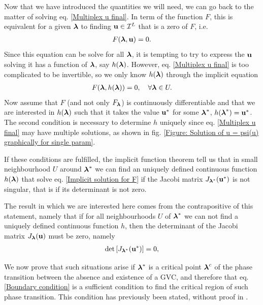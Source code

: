 \documentclass[
11pt, %
english, %
singlespacing, %
nolistspacing, %
liststotoc, %
headsepline, %
]{MastersDoctoralThesis} %
\begin{document}
Now that we have introduced the quantities we will need, we can go back to the matter of solving eq. \eqref{Multiplex u final}. In term of the function $F$, this is equivalent for a given $\boldsymbol{\mathrm{\lambda}}$ to finding $\boldsymbol{\mathrm{u}} \in \mathcal{I}^L$ that is a zero of $F$, i.e.
\begin{align}
	F(\boldsymbol{\mathrm{\lambda}}, \boldsymbol{\mathrm{u}}) = 0. \label{Implicit equation}
\end{align}
Since this equation can be solve for all $\boldsymbol{\mathrm{\lambda}}$, it is tempting to try to express the $\boldsymbol{\mathrm{u}}$ solving it has a function of $\boldsymbol{\mathrm{\lambda}}$, say $h(\boldsymbol{\mathrm{\lambda}})$. However, eq. \eqref{Multiplex u final} is too complicated to be invertible, so we only know $h(\boldsymbol{\mathrm{\lambda}})$ through the implicit equation
\begin{align}
	F(\boldsymbol{\mathrm{\lambda}}, h(\boldsymbol{\mathrm{\lambda}})) = 0, \quad \forall \boldsymbol{\mathrm{\lambda}} \in U. \label{Implicit solution for F}
\end{align}
Now assume that $F$ (and not only $F_{\boldsymbol{\mathrm{\lambda}}}$) is continuously differentiable and that we are interested in $h(\boldsymbol{\mathrm{\lambda}})$ such that it takes the value $\boldsymbol{\mathrm{u}}^*$ for some $\boldsymbol{\mathrm{\lambda}}^*$, $h(\boldsymbol{\mathrm{\lambda}}^*) = \boldsymbol{\mathrm{u}}^*$. The second condition is necessary to determine $h$ uniquely since eq. \eqref{Multiplex u final} may have multiple solutions, as shown in fig. \ref{Figure: Solution of u = psi(u) graphically for single param}.

If these conditions are fulfilled, the implicit function theorem tell us that in small neighbourhood $U$ around $\boldsymbol{\mathrm{\lambda}}^*$ we can find an uniquely defined continuous function $h(\boldsymbol{\mathrm{\lambda}})$ that solve eq. \eqref{Implicit solution for F} if the Jacobi matrix $J_{\boldsymbol{\mathrm{\lambda}}^*}(\boldsymbol{\mathrm{u}}^*)$ is not singular, that is if its determinant is not zero.

The result in which we are interested here comes from the contrapositive of this statement, namely that if for all neighbourhoods $U$ of $\boldsymbol{\mathrm{\lambda}}^*$ we can not find a uniquely defined continuous function $h$, then the determinant of the Jacobi matrix $J_{\boldsymbol{\mathrm{\lambda}}}(\boldsymbol{\mathrm{u}})$ must be zero, namely
\begin{align}
	\det\left[ J_{\boldsymbol{\mathrm{\lambda}}^*}(\boldsymbol{\mathrm{u}}^*) \right] = 0 \label{Boundary condition},
\end{align}

We now prove that such situations arise if $\boldsymbol{\mathrm{\lambda}}^*$ is a critical point $\boldsymbol{\mathrm{\lambda}}^c$ of the phase transition between the absence and existence of a GVC, and therefore that eq. \eqref{Boundary condition} is a sufficient condition to find the critical region of such phase transition. This condition has previously been stated, without proof in \cite{baxter2012avalanche}. 
\end{document}
